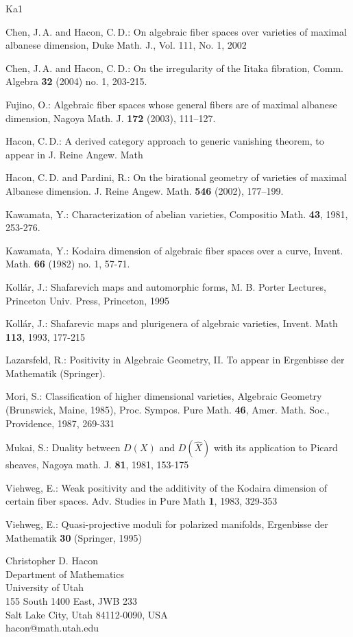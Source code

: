 \documentclass[10pt, a4paper]{amsart}
\begin{document}
\begin{thebibliography}{Ka1}

{\sc Chen, J.\,A.} and {\sc Hacon, C.\,D.}:
On algebraic fiber spaces over varieties of maximal albanese dimension,
Duke Math. J., Vol. 111, No. 1, 2002

{\sc Chen, J.\,A.} and {\sc Hacon, C.\,D.}:
On the irregularity of the Iitaka fibration,
Comm. Algebra {\bf 32} (2004) no. 1, 203-215.

{\sc Fujino, O.}:
Algebraic fiber spaces whose general  fibers
are of maximal albanese dimension,
Nagoya Math. J.  {\bf 172}  (2003), 111--127.

{\sc Hacon, C.\,D.}:
A derived category approach to generic vanishing theorem,
to appear in J. Reine Angew. Math 

{\sc Hacon, C.\,D.} and {Pardini, R.}:
On the birational geometry of varieties of maximal Albanese dimension.  
J. Reine Angew. Math.  {\bf 546}  (2002), 177--199.

{\sc Kawamata, Y.}:
Characterization of abelian varieties,
Compositio Math. {\bf 43}, 1981, 253-276.

{\sc Kawamata, Y.}: Kodaira dimension of algebraic fiber spaces over a curve,
Invent. Math. {\bf 66} (1982) no. 1, 57-71.


{\sc Koll\'ar, J.}:
Shafarevich maps and automorphic forms,
M. B. Porter Lectures, Princeton Univ. Press, Princeton, 1995

{\sc Koll\'ar, J.}:
Shafarevic maps and plurigenera of algebraic varieties, Invent. Math {\bf 113},
1993, 177-215

{\sc Lazarsfeld, R.}:
Positivity in Algebraic Geometry, II. To appear in 
Ergenbisse der Mathematik (Springer).

{\sc Mori, S.}:
Classification of higher dimensional varieties, Algebraic Geometry 
(Brunswick, Maine, 1985), Proc. Sympos. Pure Math. {\bf 46},
Amer. Math. Soc., Providence, 1987, 269-331

{\sc Mukai, S.}:
Duality between $D(X)$ and $D(\hat {X})$
with its application to Picard sheaves,
Nagoya math. J. {\bf 81},
1981, 153-175

{\sc}

{\sc Viehweg, E.}:
Weak positivity and the additivity of the Kodaira dimension
of certain fiber spaces.
Adv. Studies in Pure Math {\bf 1}, 1983, 329-353

{\sc Viehweg, E.}:
Quasi-projective moduli for polarized manifolds,
Ergenbisse der Mathematik {\bf 30} (Springer, 1995)
\end{thebibliography}
\bigskip
\bigskip

\begin{minipage}{13cm}
\parbox[t]{12.5cm}{Christopher D. Hacon\\
Department of Mathematics\\
University of Utah\\
155 South 1400 East, JWB 233\\
Salt Lake City, Utah 84112-0090, USA\\
hacon@math.utah.edu}
\end{minipage}
\end{document}
